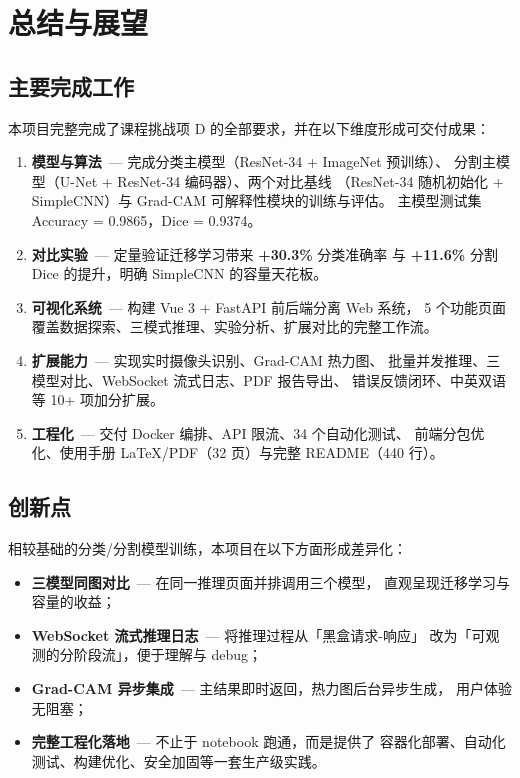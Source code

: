 \documentclass[12pt, a4paper, openany]{ctexbook}
\begin{document}
\chapter{总结与展望}
\label{ch:conclusion}

\section{主要完成工作}

本项目完整完成了课程挑战项 D 的全部要求，并在以下维度形成可交付成果：

\begin{enumerate}[leftmargin=*]
  \item \textbf{模型与算法}\ — 完成分类主模型（ResNet-34 + ImageNet 预训练）、
        分割主模型（U-Net + ResNet-34 编码器）、两个对比基线
        （ResNet-34 随机初始化 + SimpleCNN）与 Grad-CAM 可解释性模块的训练与评估。
        主模型测试集 Accuracy = 0.9865，Dice = 0.9374。
  \item \textbf{对比实验}\ — 定量验证迁移学习带来 \textbf{+30.3\%} 分类准确率
        与 \textbf{+11.6\%} 分割 Dice 的提升，明确 SimpleCNN 的容量天花板。
  \item \textbf{可视化系统}\ — 构建 Vue 3 + FastAPI 前后端分离 Web 系统，
        5 个功能页面覆盖数据探索、三模式推理、实验分析、扩展对比的完整工作流。
  \item \textbf{扩展能力}\ — 实现实时摄像头识别、Grad-CAM 热力图、
        批量并发推理、三模型对比、WebSocket 流式日志、PDF 报告导出、
        错误反馈闭环、中英双语等 10+ 项加分扩展。
  \item \textbf{工程化}\ — 交付 Docker 编排、API 限流、34 个自动化测试、
        前端分包优化、使用手册 LaTeX/PDF（32 页）与完整 README（440 行）。
\end{enumerate}

\section{创新点}

相较基础的分类/分割模型训练，本项目在以下方面形成差异化：

\begin{itemize}[leftmargin=*]
  \item \textbf{三模型同图对比}\ — 在同一推理页面并排调用三个模型，
        直观呈现迁移学习与容量的收益；
  \item \textbf{WebSocket 流式推理日志}\ — 将推理过程从「黑盒请求-响应」
        改为「可观测的分阶段流」，便于理解与 debug；
  \item \textbf{Grad-CAM 异步集成}\ — 主结果即时返回，热力图后台异步生成，
        用户体验无阻塞；
  \item \textbf{完整工程化落地}\ — 不止于 notebook 跑通，而是提供了
        容器化部署、自动化测试、构建优化、安全加固等一套生产级实践。
\end{itemize}
\end{document}
